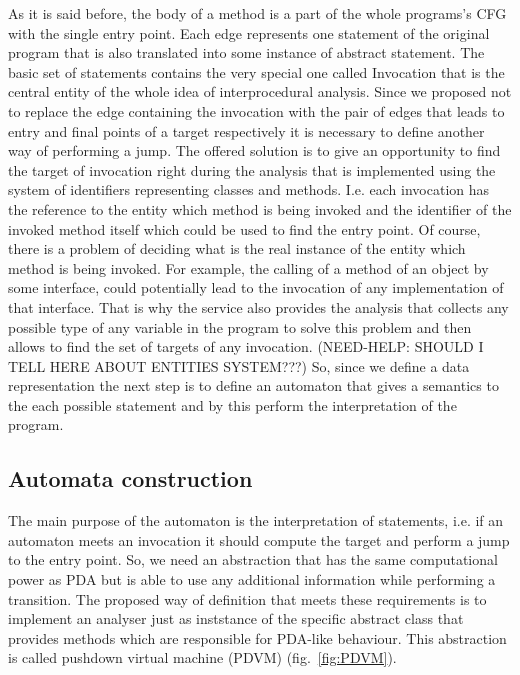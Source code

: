 As it is said before, the body of a method is a part of the whole programs's CFG with the single entry point.
Each edge represents one statement of the original program that is also translated into some instance of abstract statement.
The basic set of statements contains the very special one called Invocation that is the central entity of the whole idea of interprocedural analysis.
Since we proposed not to replace the edge containing the invocation with the pair of edges that leads to entry and final points of a target respectively it is necessary to define another way of performing a jump.
The offered solution is to give an opportunity to find the target of invocation right during the analysis that is implemented using the system of identifiers representing classes and methods.
I.e. each invocation has the reference to the entity which method is being invoked and the identifier of the invoked method itself which could be used to find the entry point.
Of course, there is a problem of deciding what is the real instance of the entity which method is being invoked.
For example, the calling of a method of an object by some interface, could potentially lead to the invocation of any implementation of that interface.
That is why the service also provides the analysis that collects any possible type of any variable in the program to solve this problem and then allows to find the set of targets of any invocation.
(NEED-HELP: SHOULD I TELL HERE ABOUT ENTITIES SYSTEM???)
So, since we define a data representation the next step is to define an automaton that gives a semantics to the each possible statement and by this perform the interpretation of the program.

\subsection{Automata construction}

The main purpose of the automaton is the interpretation of statements, i.e. if an automaton meets an invocation it should compute the target and perform a jump to the entry point.
So, we need an abstraction that has the same computational power as PDA but is able to use any additional information while performing a transition. 
The proposed way of definition that meets these requirements is to implement an analyser just as inststance of the specific abstract class that provides methods which are responsible for PDA-like behaviour.
This abstraction is called pushdown virtual machine (PDVM) (fig.~\ref{fig:PDVM}).


